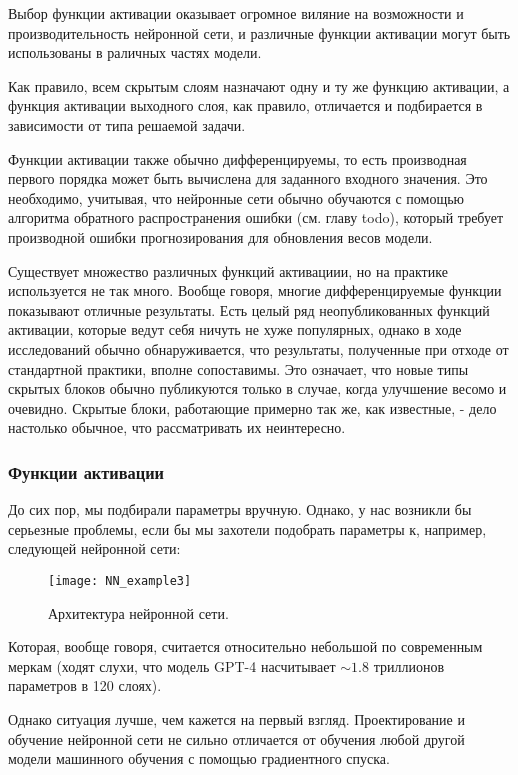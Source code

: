 Выбор функции активации оказывает огромное виляние на возможности и производительность 
нейронной сети, и различные функции активации могут быть использованы в раличных частях модели.

Как правило, всем скрытым слоям назначают одну и ту же функцию активации, 
а функция активации выходного слоя, как правило, отличается и подбирается в 
зависимости от типа решаемой задачи.

Функции активации также обычно дифференцируемы, то есть производная первого порядка 
может быть вычислена для заданного входного значения. Это необходимо, учитывая, что 
нейронные сети обычно обучаются с помощью алгоритма обратного распространения ошибки 
(см. главу {\color{red} todo}), 
который требует производной ошибки прогнозирования для обновления весов модели.

Существует множество различных функций активациии, но на практике используется не 
так много. Вообще говоря, многие дифференцируемые функции показывают отличные результаты. 
Есть целый ряд неопубликованных функций активации, которые ведут
себя ничуть не хуже популярных, однако в ходе исследований обычно 
обнаруживается, что результаты, полученные при отходе от стандартной практики, 
вполне сопоставимы. Это означает, что новые типы скрытых блоков
обычно публикуются только в случае, когда улучшение весомо и очевидно. Скрытые
блоки, работающие примерно так же, как известные, - дело настолько обычное, что
рассматривать их неинтересно.

\subsubsection{Функции активации}

До сих пор, мы подбирали параметры вручную. Однако, у нас возникли бы серьезные 
проблемы, если бы мы захотели подобрать параметры к, например, следующей нейронной сети:

\begin{figure}[h!]
    \centering
    \texttt{[image: NN\_example3]}
    \caption{Архитектура нейронной сети.}
    \label{fig:NN3}
\end{figure}

Которая, вообще говоря, считается относительно небольшой по современным меркам 
(ходят слухи, что модель GPT-4 насчитывает $\sim 1.8$ триллионов параметров в 
120 слоях).

Однако ситуация лучше, чем кажется на первый взгляд. 
Проектирование и обучение нейронной сети не сильно отличается от обучения 
любой другой модели машинного обучения с помощью градиентного спуска. 

